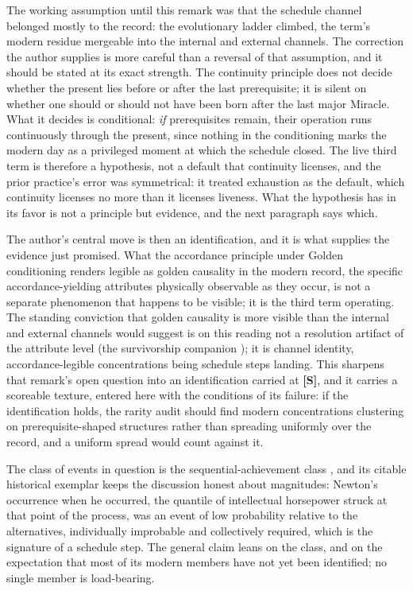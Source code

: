 \begin{remark}
\label{sch:rem:notexhausted}
The working assumption until this remark was that the schedule
channel belonged mostly to the record: the evolutionary ladder
climbed, the term's modern residue mergeable into the internal and
external channels. The correction the author supplies is more
careful than a reversal of that assumption, and it should be stated
at its exact strength. The continuity principle does not decide
whether the present lies before or after the last prerequisite; it
is silent on whether one should or should not have been born after
the last major Miracle. What it decides is conditional: \emph{if}
prerequisites remain, their operation runs continuously through the
present, since nothing in the conditioning marks the modern day as
a privileged moment at which the schedule closed. The live third
term is therefore a hypothesis, not a default that continuity
licenses, and the prior practice's error was symmetrical: it treated
exhaustion as the default, which continuity licenses no more than
it licenses liveness. What the hypothesis has in its favor is not a
principle but evidence, and the next paragraph says which.

The author's central move is then an identification, and it is
what supplies the evidence just promised. What the
accordance principle under Golden conditioning renders legible as
golden causality in the modern record, the specific
accordance-yielding attributes physically observable as they occur,
is not a separate phenomenon that happens to be visible; it is the
third term operating. The standing conviction that golden causality
is more visible than the internal and external channels would
suggest is on this reading not a resolution artifact of the
attribute level (the survivorship companion \cite{GoldenSurvivorship}); it is
channel identity, accordance-legible concentrations being schedule
steps landing. This sharpens that remark's open question into an
identification carried at \textbf{[S]}, and it carries a scoreable
texture, entered here with the conditions of its failure: if the
identification holds, the rarity audit should find modern
concentrations clustering on prerequisite-shaped structures rather
than spreading uniformly over the record, and a uniform spread would
count against it.

The class of events in question is the sequential-achievement class
\cite{Outliers}, and its citable historical exemplar keeps the
discussion honest about magnitudes: Newton's occurrence when he
occurred, the quantile of intellectual horsepower struck at that
point of the process, was an event of low probability relative to
the alternatives, individually improbable and collectively required,
which is the signature of a schedule step. The general claim leans
on the class, and on the expectation that most of its modern members
have not yet been identified; no single member is load-bearing.


\end{remark}

